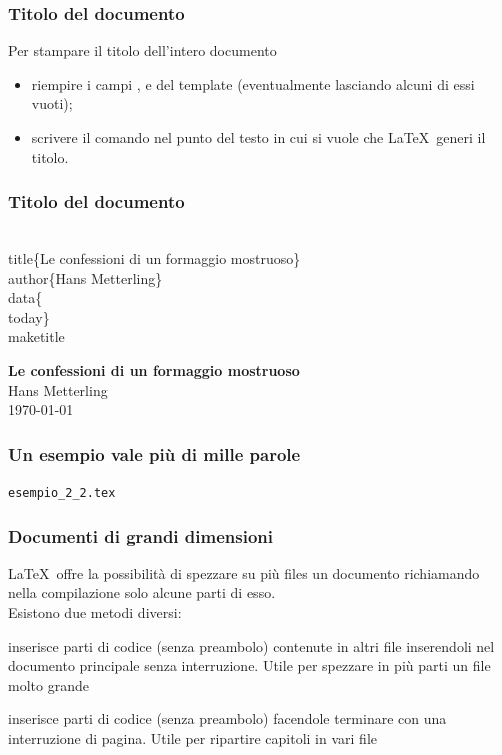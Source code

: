 \documentclass[svgnames,%
	ucs,%
	pdftex]{guitbeamer}
\begin{document}
\begin{frame}
  \frametitle{Titolo del documento}
	Per stampare il titolo dell'intero documento
	\begin{itemize}
		\item riempire i campi ,  e  del template (eventualmente lasciando alcuni di essi vuoti);
		\item scrivere il comando  nel punto del testo in cui si vuole che \LaTeX\ generi il titolo.
	\end{itemize}
\end{frame}
\begin{frame}
  \frametitle{Titolo del documento}
	\begin{LaTeXcode}
		\\title\{\alert{Le confessioni di un formaggio mostruoso}\}\n
		\\author\{\alert{Hans Metterling}\}\n
		\\data\{\alert{\\today}\}\n\n
		\\maketitle
	\end{LaTeXcode}
	\begin{LaTeXoutput}\centering
		\textbf{\Large Le confessioni di un formaggio mostruoso}\\
	  \medskip
		Hans Metterling\\
	  \smallskip
		\today
	\end{LaTeXoutput}
\end{frame}
\begin{frame}
  \frametitle{Un esempio vale pi\`u di mille parole}
	\begin{center}
		\alert{\texttt{esempio\_2\_2.tex}}
	\end{center}
\end{frame}
\begin{frame}
  \frametitle{Documenti di grandi dimensioni}
	\LaTeX\ offre la possibilit\`a di spezzare su pi\`u files un documento richiamando nella compilazione solo alcune parti di esso.\\
	Esistono due metodi diversi:
  \medskip
	\begin{LaTeXcode}
		\\{\alert{<nome-file>}\}
	\end{LaTeXcode}
	inserisce parti di codice (senza preambolo) contenute in altri file inserendoli nel documento principale senza interruzione. Utile per spezzare in pi\`u parti un file molto grande 
	\begin{LaTeXcode}
		\\{\alert{<nome-file>}\}
	\end{LaTeXcode}
	inserisce parti di codice (senza preambolo) facendole terminare con una interruzione di pagina. Utile per ripartire capitoli in vari file 
\end{frame}
\end{document}
